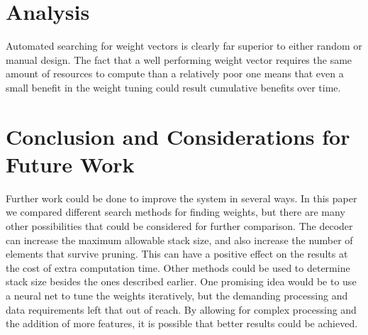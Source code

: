 \documentclass[11pt,letterpaper]{article}
\begin{document}



\section{Analysis}

Automated searching for weight vectors is clearly far superior to either random or manual design. The fact that a well performing weight vector requires the same amount of resources to compute than a relatively poor one means that even a small benefit in the weight tuning could result cumulative benefits over time.


\section{Conclusion and Considerations for Future Work}

Further work could be done to improve the system in several ways. In this paper we compared different search methods for finding weights, but there are many other possibilities that could be considered for further comparison. The decoder can increase the maximum allowable stack size, and also increase the number of elements that survive pruning. This can have a positive effect on the results at the cost of extra computation time. Other methods could be used to determine stack size besides the ones described earlier. One promising idea would be to use a neural net to tune the weights iteratively, but the demanding processing and data requirements left that out of reach. By allowing for complex processing and the addition of more features, it is possible that better results could be achieved. 




\end{document}
